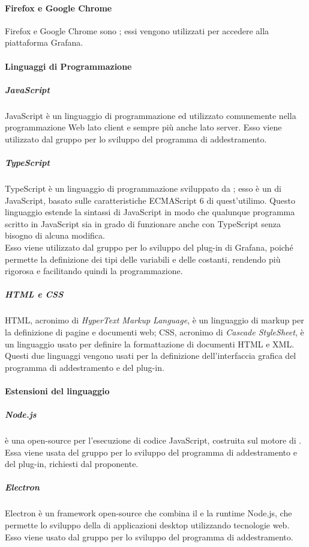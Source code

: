 \documentclass[../norme-di-progetto.tex]{subfiles}
\begin{document}
\paragraph{Firefox e Google Chrome}
Firefox e Google Chrome sono ; essi vengono utilizzati per accedere alla piattaforma Grafana.

\paragraph{Linguaggi di Programmazione}
\subparagraph{JavaScript}
JavaScript è un linguaggio di programmazione  ed  utilizzato comunemente nella programmazione Web lato client e sempre più anche lato server. Esso viene utilizzato dal gruppo per lo sviluppo del programma di addestramento.

\subparagraph{TypeScript}
TypeScript è un linguaggio di programmazione sviluppato da ; esso è un  di JavaScript, basato sulle caratteristiche ECMAScript 6 di quest'utilimo. Questo linguaggio estende la sintassi di JavaScript in modo che qualunque programma scritto in JavaScript sia in grado di funzionare anche con TypeScript senza bisogno di alcuna modifica. \\
Esso viene utilizzato dal gruppo per lo sviluppo del plug-in di Grafana, poiché permette la definizione dei tipi delle variabili e delle costanti, rendendo più rigorosa e facilitando quindi la programmazione.

\subparagraph{HTML e CSS}
HTML, acronimo di \textit{HyperText Markup Language}, è un linguaggio di markup per la definizione di pagine e documenti web; CSS, acronimo di \textit{Cascade StyleSheet}, è un linguaggio usato per definire la formattazione di documenti HTML e XML. Questi due linguaggi vengono usati per la definizione dell'interfaccia grafica del programma di addestramento e del plug-in.

\paragraph{Estensioni del linguaggio}
\subparagraph{Node.js}
 è una  open-source per l'esecuzione di codice JavaScript, costruita sul motore  di . Essa viene usata del gruppo per lo sviluppo del programma di addestramento e del plug-in, richiesti dal proponente.

\subparagraph{Electron}
Electron è un framework open-source che combina il   e la runtime Node.js, che permette lo sviluppo della  di applicazioni desktop utilizzando tecnologie web. Esso viene usato dal gruppo per lo sviluppo del programma di addestramento.
\end{document}
